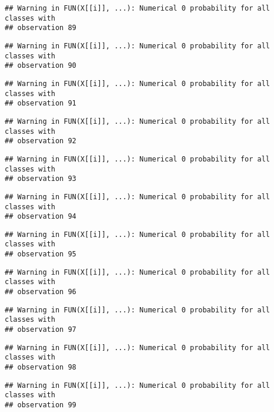 \documentclass[
]{article}
\begin{document}
\begin{verbatim}
## Warning in FUN(X[[i]], ...): Numerical 0 probability for all classes with
## observation 89
\end{verbatim}

\begin{verbatim}
## Warning in FUN(X[[i]], ...): Numerical 0 probability for all classes with
## observation 90
\end{verbatim}

\begin{verbatim}
## Warning in FUN(X[[i]], ...): Numerical 0 probability for all classes with
## observation 91
\end{verbatim}

\begin{verbatim}
## Warning in FUN(X[[i]], ...): Numerical 0 probability for all classes with
## observation 92
\end{verbatim}

\begin{verbatim}
## Warning in FUN(X[[i]], ...): Numerical 0 probability for all classes with
## observation 93
\end{verbatim}

\begin{verbatim}
## Warning in FUN(X[[i]], ...): Numerical 0 probability for all classes with
## observation 94
\end{verbatim}

\begin{verbatim}
## Warning in FUN(X[[i]], ...): Numerical 0 probability for all classes with
## observation 95
\end{verbatim}

\begin{verbatim}
## Warning in FUN(X[[i]], ...): Numerical 0 probability for all classes with
## observation 96
\end{verbatim}

\begin{verbatim}
## Warning in FUN(X[[i]], ...): Numerical 0 probability for all classes with
## observation 97
\end{verbatim}

\begin{verbatim}
## Warning in FUN(X[[i]], ...): Numerical 0 probability for all classes with
## observation 98
\end{verbatim}

\begin{verbatim}
## Warning in FUN(X[[i]], ...): Numerical 0 probability for all classes with
## observation 99
\end{verbatim}
\end{document}
